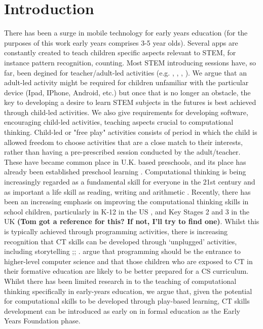 \documentclass{sig-alternate}
\begin{document}
\section{Introduction}
There has been a surge in mobile technology for early years education (for the purposes of this work early years comprises 3-5 year olds). Several apps are constantly created to teach children specific aspects relevant to STEM, for instance pattern recognition, counting. Most STEM introducing sessions have, so far, been degined for teacher/adult-led activities (e.g. \cite{aronin2013},  \cite{abbas2014ontocog}, \cite{zanchi2013next}, \cite{blair2013learning}). We argue that an adult-led activity might be required for children unfamiliar with the particular device (Ipad, IPhone, Android, etc.) but once that is no longer an obstacle, the key to developing a desire to learn STEM subjects in the futures is best achieved through child-led activities. We also give requirements for developing software, encouraging child-led activities, teaching aspects crucial to computational thinking. Child-led or "free play" activities \cite{bredekamp1987developmentally} consists of period in which the child is allowed freedom to choose activities that are a close match to their interests, rather than having a pre-prescribed session conducted by the adult/teacher. These have became common place in U.K. based preschools, and its place has already been established preschool learning \cite{DiChilvers}.
Computational thinking is being increasingly regarded as a fundamental skill for everyone in the 21st century \cite{Yadav2014} and as important a life skill as reading, writing and arithmetic \cite{Wing}.  Recently, there has been an increasing emphasis on improving the computational thinking skills in school children, particularly in K-12 in the US \cite{Settle2012}, \cite{Yadav2011} and Key Stages 2 and 3 in the UK \textbf{(Tom got a reference for this?  If not, I'll try to find one)}.  Whilst this is typically achieved through programming activities, there is increasing recognition that CT skills can be developed through ‘unplugged’ activities, including storytelling \cite{Thies2012};\cite{Curzon2013}; \cite{Cortina2015}.  \cite{Lu2009} argue that programming should be the entrance to higher-level computer science and that those children who are exposed to CT in their formative education are likely to be better prepared for a CS curriculum.  Whilst there has been limited research in to the teaching of computational thinking specifically in early-years education, we argue that, given the potential for computational skills to be developed through play-based learning, CT skills development can be introduced as early on in formal education as the Early Years Foundation phase. 
\end{document}
